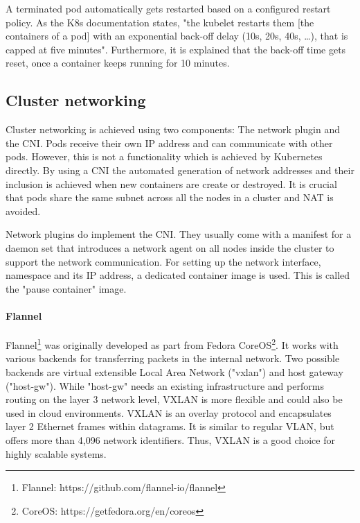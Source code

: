 A terminated pod automatically gets restarted based on a configured restart policy. As the \ac{K8s} documentation states, "the kubelet restarts them [the containers of a pod] with an exponential back-off delay (10s, 20s, 40s, …), that is capped at five minutes"\cite{Kubernetes.20230217}. Furthermore, it is explained that the back-off time gets reset, once a container keeps running for 10 minutes\cite{Kubernetes.20230217}.


\subsection{Cluster networking}
Cluster networking is achieved using two components: The network plugin and the \ac{CNI}. Pods receive their own \ac{IP} address and can communicate with other pods. However, this is not a functionality which is achieved by Kubernetes directly. By using a \ac{CNI} the automated generation of network addresses and their inclusion is achieved when new containers are create or destroyed. It is crucial that pods share the same subnet across all the nodes in a cluster and \ac{NAT} is avoided\cite{Luksa.2018}.

Network plugins do implement the \ac{CNI}. They usually come with a manifest for a daemon set that introduces a network agent on all nodes inside the cluster to support the network communication.
For setting up the network interface, namespace and its \ac{IP} address, a dedicated container image is used. This is called the "pause container" image.

\paragraph*{Flannel}
Flannel\footnote{Flannel: https://github.com/flannel-io/flannel} was originally developed as part from Fedora CoreOS\footnote{CoreOS: https://getfedora.org/en/coreos}\cite{SuseRancherCommunity.20230212}. It works with various backends for transferring packets in the internal network. Two possible backends are virtual extensible Local Area Network ("vxlan") and host gateway ("host-gw"). While "host-gw" needs an existing infrastructure and performs routing on the layer 3 network level, VXLAN is more flexible and could also be used in cloud environments\cite{GitHubFlannel.io.20230212}. VXLAN is an overlay protocol and encapsulates layer 2 Ethernet frames within datagrams\cite{SuseRancherCommunity.20230212}. It is similar to regular VLAN, but offers more than 4,096 network identifiers\cite{SuseRancherCommunity.20230212}. Thus, VXLAN is a good choice for highly scalable systems.

